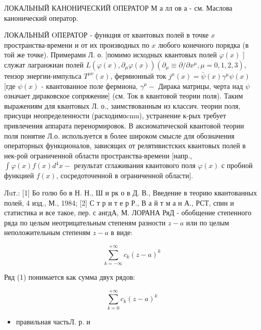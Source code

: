 \documentclass[10pt]{article}
\begin{document}
ЛОКАЛЬНЫЙ КАНОНИЧЕСКИЙ ОПЕРАТОР М а лл ов а - см. Маслова канонический оператор.



ЛОКАЛЬНЫЙ OПЕРАТОР - функция от квантовых полей в точке $x$ пространства-времени и от их производных по $x$ любого конечного порядка (в той же точке). Примерами Л. о. [помимо исходных квантовых полей $\varphi(x)$ ] служат лагранжиан полей $L\left(\varphi(x), \partial_{\mu} \varphi(x)\right)\left(\partial_{\mu} \equiv \partial / \partial x^{\mu}, \mu=0,1,2,3\right)$, тензор энергии-импульса $T^{\mu \nu}(x)$, фермионный ток $j^{\mu}(x)=\bar{\psi}(x) \gamma^{\mu} \psi(x)$ [где $\psi(x)$ - квантованное поле фермиона, $\gamma^{\mu}-$ Дирака матрицы, черта над $\psi$ означает дираковское сопряжение] (см. Ток в квантовой теории поля). Таким выражениям для квантовых Л. о., заимствованным из классич. теории поля, присущи неопределенности (расходимоcmu), устранение к-рых требует привлечения аппарата перенормировок. В аксиоматической квантовой теории поля понятие Л.о. используется в более широком смысле для обозначения операторных функционалов, зависящих от релятивистских квантовых полей в нек-рой ограниченной области пространства-времени [напр., $\int \varphi(x) f(x) d^{4} x-$ результат сглаживания квантового поля $\varphi(x)$ с пробной функцией $f(x)$, сосредоточенной в ограниченной области].



Лuт.: [1] Бо голю бо в Н. Н., Ш и рк о в Д. В., Введение в теорию квантованных полей, 4 изд., М., 1984; [2] С т р и т е р Р., В а й т м а н А., РСТ, спин и статистика и все такое, пер. с ангдА, М. ЛОРАНА РяД - обобщение степенного ряда по целым неотрицательным степеням разности $z-a$ или по целым неположительным степеням $z-a$ в виде:



\[

\sum_{k=-\infty}^{+\infty} c_{k}(z-a)^{k}

\]



Ряд (1) понимается как сумма двух рядов:



\[

\sum_{k=0}^{+\infty} c_{k}(z-a)^{k}

\]



\begin{itemize}

  \item правильная частьЛ. р. и

\end{itemize}
\end{document}
